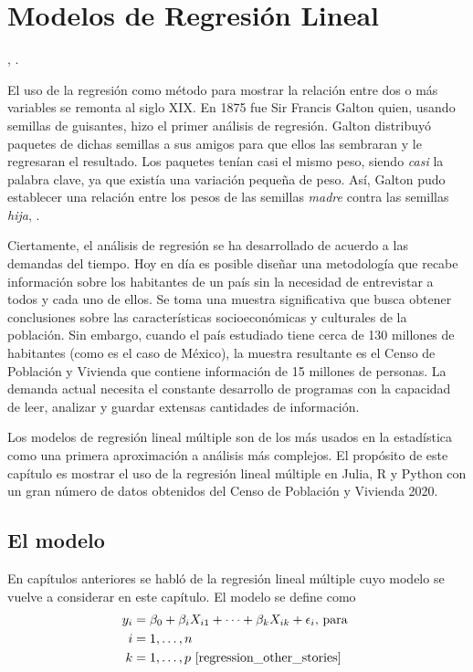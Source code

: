 \chapter{Modelos de Regresión Lineal} \label{cap_rlm}

, \cite{seber2003linear}. 

El uso de la regresión como método para mostrar la relación entre dos o más variables se remonta al siglo XIX. En 1875 fue Sir Francis Galton quien, usando semillas de guisantes, hizo el primer análisis de regresión. Galton distribuyó paquetes de dichas semillas a sus amigos para que ellos las sembraran y le regresaran el resultado. Los paquetes tenían casi el mismo peso, siendo \textit{casi} la palabra clave, ya que existía una variación pequeña de peso. Así, Galton pudo establecer una relación entre los pesos de las semillas \textit{madre} contra las semillas \textit{hija}, \cite{stanton2001galton}. 

Ciertamente, el análisis de regresión se ha desarrollado de acuerdo a las demandas del tiempo. Hoy en día es posible diseñar una metodología que recabe información sobre los habitantes de un país sin la necesidad de entrevistar a todos y cada uno de ellos. Se toma una muestra significativa que busca obtener conclusiones sobre las características socioeconómicas y culturales de la población. Sin embargo, cuando el país estudiado tiene cerca de 130 millones de habitantes (como es el caso de México), la muestra resultante es el Censo de Población y Vivienda que contiene información de 15 millones de personas. La demanda actual necesita el constante desarrollo de programas con la capacidad de leer, analizar y guardar extensas cantidades de información. 

Los modelos de regresión lineal múltiple son de los más usados en la estadística como una primera aproximación a análisis más complejos. El propósito de este capítulo es mostrar el uso de la regresión lineal múltiple  en \textsf{Julia, R} y \textsf{Python} con un gran número de datos obtenidos del Censo de Población y Vivienda 2020.  


\section{El modelo}
En capítulos anteriores se habló de la regresión lineal múltiple cuyo modelo se vuelve a considerar en este capítulo. El modelo se define como 
\begin{equation} \label{rlm_eq}
    \begin{aligned}
    y_i &= \beta_0 + \beta_i X_{i1} + \dots + \beta_k X_{ik} + \epsilon_i \text{, para } \\
    i &= 1, \dots, n \\ 
    k &= 1, \dots, p 
	\text{ \cite[p.~146]{regression_other_stories}}
    \end{aligned}
\end{equation}

